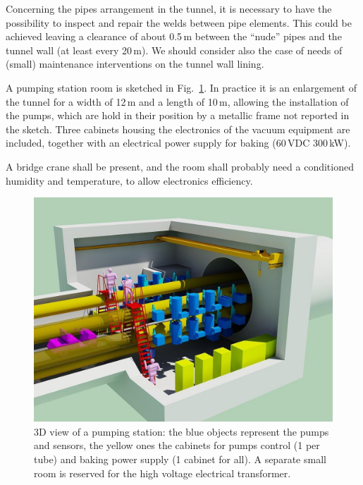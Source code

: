 Concerning the pipes arrangement in the tunnel, it is necessary to have the possibility to inspect and repair the welds between pipe elements. This could be achieved leaving a clearance of about 0.5\,m between the ``nude'' pipes and the tunnel wall (at least every 20\,m). We should consider also the case of needs of (small) maintenance interventions on the tunnel wall lining.

A pumping station room is sketched in Fig.~\ref{fig:VAC7}. In practice it is an enlargement of the tunnel for a width of 12\,m and a length of 10\,m, allowing the installation of the pumps, which are hold in their position by a metallic frame not reported in the sketch. Three cabinets  housing the electronics of the vacuum equipment are included, together with an electrical power supply for baking (60\,VDC 300\,kW).

A bridge crane shall be present, and the room shall probably need a conditioned humidity and temperature, to allow electronics efficiency.

\begin{figure}
\begin{center}
\includegraphics[width=\textwidth]{Sec_SiteInfra/Figures/VAC7.jpg}
\caption{3D view of a pumping station: the blue objects represent the pumps and sensors, the yellow ones the cabinets for pumps control (1 per tube) and baking power supply (1 cabinet for all). A separate small room is reserved for the high voltage electrical transformer.}
\label{fig:VAC7}
\end{center}
\end{figure}


